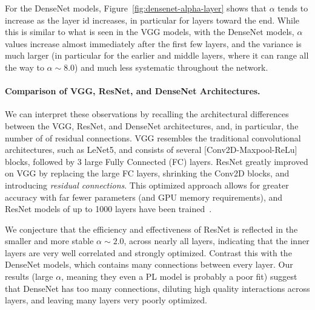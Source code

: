 For the DenseNet models, Figure~\ref{fig:densenet-alpha-layer} shows that $\alpha$ tends to increase as the layer id increases, in particular for layers toward the end.
While this is similar to what is seen in the VGG models, with the DenseNet models, $\alpha$ values increase almost immediately after the first few layers, and the variance is much larger (in particular for the earlier and middle layers, where it can range all the way to $\alpha\sim 8.0$) and much less systematic throughout the network.



\vspace{-1mm}
\paragraph{Comparison of VGG, ResNet, and DenseNet Architectures.}
We can interpret these observations by recalling the architectural differences between the VGG, ResNet, and DenseNet architectures,
and, in particular, the number of of residual connections. VGG resembles the  traditional convolutional architectures,
such as LeNet5, and consists of several [Conv2D-Maxpool-ReLu] blocks, followed by 3 large Fully Connected (FC) layers.
ResNet greatly improved on VGG by replacing the large FC layers, shrinking the Conv2D blocks, and introducing \emph{residual connections}.
This optimized approach allows for greater accuracy with far fewer parameters (and GPU memory requirements), and
ResNet models of up to 1000 layers have been trained~\cite{resnet1000}.

We conjecture that the efficiency and effectiveness of ResNet is reflected in the smaller and more stable $\alpha\sim 2.0$, across nearly all layers, indicating that the inner layers are very well correlated and strongly optimized.
Contrast this with the DenseNet models, which contains many connections between every layer.
Our results (large $\alpha$, meaning they even a PL model is probably a poor fit) suggest that DenseNet has too many connections, diluting high quality interactions across layers, and leaving many layers very poorly optimized.



